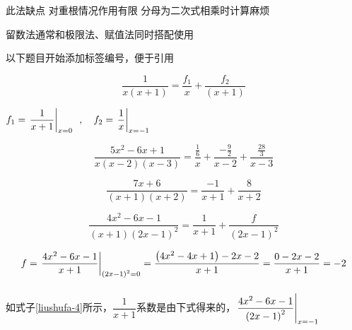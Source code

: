 此法缺点\hspace{2em}  \textbullet \hspace{0.5em} 对重根情况作用有限 \hspace{1em}  \textbullet \hspace{0.5em} 分母为二次式相乘时计算麻烦

留数法通常和极限法、赋值法同时搭配使用

以下题目开始添加标签编号，便于引用

\clearpage


\begin{equation}\label{liushufa-1}
	\dfrac{1}{x\left(x+1\right)}=\dfrac{f_{1}}{x}+\dfrac{f_{2}}{\left(x+1\right)}
\end{equation}

\begin{center}
	$f_{1}=\left. \dfrac{1}{x+1} \right|_{x=0} \hspace{0.5em} , \hspace{1em} f_{2}=\left. \dfrac{1}{x} \right|_{x=-1}$
\end{center}

\begin{equation}\label{liushufa-2}
	\dfrac{5x^{2}-6x+1}{x\left(x-2\right)\left(x-3\right)}=\dfrac{\tfrac{1}{6}}{x}+\dfrac{-\tfrac{9}{2}}{x-2}+\dfrac{\tfrac{28}{3}}{x-3}
\end{equation}  

\begin{equation}\label{liushufa-3}
	\dfrac{7x+6}{\left(x+1\right)\left(x+2\right)}=\dfrac{-1}{x+1}+\dfrac{8}{x+2}
\end{equation}  

\begin{equation}\label{liushufa-4}
	\dfrac{4x^{2}-6x-1}{\left(x+1\right)\left(2x-1\right)^{2}}=\dfrac{1}{x+1}+\dfrac{f}{\left(2x-1\right)^{2}}
\end{equation} 

\vspace{-30pt}

\[
f=\left. \dfrac{4x^{2}-6x-1}{x+1} \right|_{\vphantom{\dfrac{1}{1}}\left(2x-1\right)^{2}=0} 
=\dfrac{\left(4x^{2}-4x+1\right)-2x-2}{x+1}
=\dfrac{0-2x-2}{x+1}=-2
\]

\vspace{-10pt}

如式子\ref{liushufa-4}所示，$\dfrac{1}{x+1}$系数是由下式得来的，$\left. \dfrac{4x^{2}-6x-1}{\left(2x-1\right)^{2}} \right|_{\vphantom{\dfrac{1}{1}} x=-1}$

